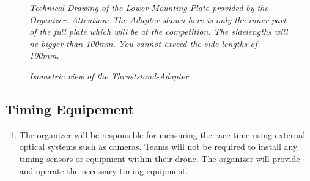 \documentclass{article}
\begin{document}
\begin{figure}
  \centering
\caption{\textit{Technical Drawing of the Lower Mounting Plate provided by the Organizer. Attention: The Adapter shown here is only the inner part of the full plate which will be at the competition. The sidelengths will ne bigger than 100mm. You cannot exceed the side lengths of 100mm.}}
\end{figure}

\begin{figure}
 \centering
\caption{\textit{Isometric view of the Thruststand-Adapter.}}
\end{figure}



\subsection{Timing Equipement}
\begin{enumerate}
  \item The organizer will be responsible for measuring the race time using external optical systems such as cameras. Teams will not be required to install any timing sensors or equipment within their drone. The organizer will provide and operate the necessary timing equipment.
\end{enumerate}
\end{document}
